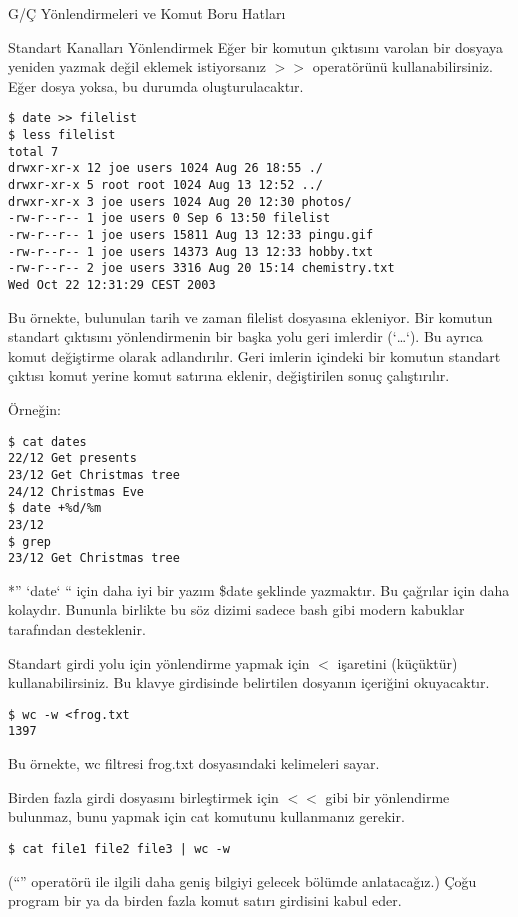 \begin{section}{G/Ç Yönlendirmeleri ve Komut Boru Hatları}
\begin{subsection}{Standart Kanalları Yönlendirmek}
Eğer bir komutun çıktısını varolan bir dosyaya yeniden yazmak değil eklemek istiyorsanız $>>$ operatörünü kullanabilirsiniz. Eğer dosya yoksa, bu durumda oluşturulacaktır.
\footnotesize
\begin{verbatim}
$ date >> filelist
$ less filelist
total 7
drwxr-xr-x 12 joe users 1024 Aug 26 18:55 ./
drwxr-xr-x 5 root root 1024 Aug 13 12:52 ../
drwxr-xr-x 3 joe users 1024 Aug 20 12:30 photos/
-rw-r--r-- 1 joe users 0 Sep 6 13:50 filelist
-rw-r--r-- 1 joe users 15811 Aug 13 12:33 pingu.gif
-rw-r--r-- 1 joe users 14373 Aug 13 12:33 hobby.txt
-rw-r--r-- 2 joe users 3316 Aug 20 15:14 chemistry.txt
Wed Oct 22 12:31:29 CEST 2003
\end{verbatim}
\normalsize

Bu örnekte, bulunulan tarih ve zaman filelist dosyasına ekleniyor. Bir komutun standart çıktısını yönlendirmenin bir başka yolu geri imlerdir (`\ldots`). Bu ayrıca komut değiştirme olarak adlandırılır. Geri imlerin içindeki bir komutun standart çıktısı komut yerine komut satırına eklenir, değiştirilen sonuç çalıştırılır.

Örneğin:
\footnotesize
\begin{verbatim}
$ cat dates 		
22/12 Get presents
23/12 Get Christmas tree
24/12 Christmas Eve
$ date +%d/%m 			
23/12
$ grep 			
23/12 Get Christmas tree
\end{verbatim}
\normalsize

*” `date` “ için daha iyi bir yazım \$date şeklinde yazmaktır. Bu çağrılar için daha kolaydır. Bununla birlikte bu söz dizimi sadece bash gibi modern kabuklar tarafından desteklenir.

Standart girdi yolu için yönlendirme yapmak için $<$ işaretini (küçüktür) kullanabilirsiniz. Bu klavye girdisinde belirtilen dosyanın içeriğini okuyacaktır.
\footnotesize
\begin{verbatim}
$ wc -w <frog.txt 
1397 
\end{verbatim}
\normalsize

Bu örnekte, wc filtresi frog.txt dosyasındaki kelimeleri sayar.

Birden fazla girdi dosyasını birleştirmek için $<<$ gibi bir yönlendirme bulunmaz, bunu yapmak için cat komutunu kullanmanız gerekir.

\footnotesize
\begin{verbatim}
$ cat file1 file2 file3 | wc -w
\end{verbatim}
\normalsize

(“\textbar” operatörü ile ilgili daha geniş bilgiyi gelecek bölümde anlatacağız.) Çoğu program bir ya da birden fazla komut satırı girdisini kabul eder.


\end{subsection}
\end{section}
